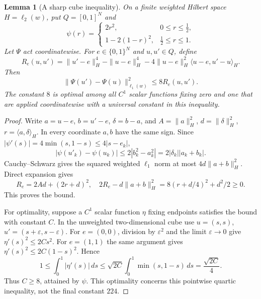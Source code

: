 \documentclass[11pt]{article}
\newtheorem{lemma}[theorem]{Lemma}
\theoremstyle{remark}\newtheorem{remark}[theorem]{Remark}
\begin{document}
\begin{lemma}[A sharp cube inequality]\label{lem:sharp}
On a finite weighted Hilbert space $H=\ell_2(w)$, put $Q=[0,1]^N$ and
\[
 \psi(r)=\begin{cases}2r^2,&0\leq r\leq\tfrac12,\\
                   1-2(1-r)^2,&\tfrac12\leq r\leq1.\end{cases}
\]
Let $\Psi$ act coordinatewise. For $e\in\{0,1\}^N$ and $u,u'\in Q$, define
\[
 R_e(u,u')=\|u'-e\|_H^4-\|u-e\|_H^4
       -4\|u-e\|_H^2\langle u-e,u'-u\rangle_H.
\]
Then
\[
 \|\Psi(u')-\Psi(u)\|_{\ell_1(w)}^2\leq8R_e(u,u').
\]
The constant $8$ is optimal among all $C^1$ scalar functions fixing zero
and one that are applied coordinatewise with a universal constant in this
inequality.
\end{lemma}
\begin{proof}
Write $a=u-e$, $b=u'-e$, $\delta=b-a$, and
$A=\|a\|_H^2$, $d=\|\delta\|_H^2$, $r=\langle a,\delta\rangle_H$.
In every coordinate $a,b$ have the same sign. Since
$|\psi'(s)|=4\min(s,1-s)\leq4|s-e_k|$,
\[
 |\psi(u'_k)-\psi(u_k)|\leq2|b_k^2-a_k^2|
                        =2|\delta_k||a_k+b_k|.
\]
Cauchy--Schwarz gives the squared weighted $\ell_1$ norm at most
$4d\|a+b\|_H^2$. Direct expansion gives
\[
 R_e=2Ad+(2r+d)^2,
\quad
 2R_e-d\|a+b\|_H^2
 =8(r+d/4)^2+d^2/2\geq0.
\]
This proves the bound.

For optimality, suppose a $C^1$ scalar function $\eta$ fixing endpoints
satisfies the bound with constant $C$. In the unweighted two-dimensional
cube use $u=(s,s)$, $u'=(s+\varepsilon,s-\varepsilon)$.
For $e=(0,0)$, division by $\varepsilon^2$ and the limit
$\varepsilon\to0$ give $\eta'(s)^2\leq2Cs^2$.
For $e=(1,1)$ the same argument gives
$\eta'(s)^2\leq2C(1-s)^2$. Hence
\[
 1\leq\int_0^1|\eta'(s)|\,ds
 \leq\sqrt{2C}\int_0^1\min(s,1-s)\,ds=\frac{\sqrt{2C}}4.
\]
Thus $C\geq8$, attained by $\psi$. This optimality concerns this pointwise
quartic inequality, not the final constant $224$.
\end{proof}
\end{document}
